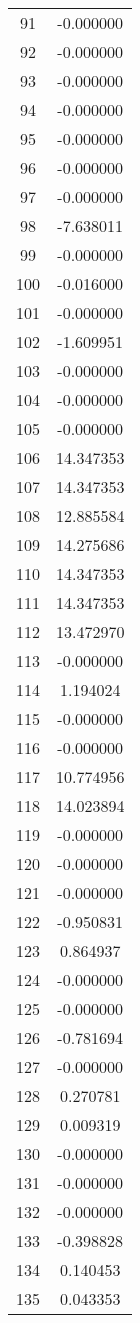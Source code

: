 \documentclass[12pt]{article}
\begin{document}
\begin{longtable}{@{}cc@{}}
91 & -0.000000 \\
92 & -0.000000 \\
93 & -0.000000 \\
94 & -0.000000 \\
95 & -0.000000 \\
96 & -0.000000 \\
97 & -0.000000 \\
98 & -7.638011 \\
99 & -0.000000 \\
100 & -0.016000 \\
101 & -0.000000 \\
102 & -1.609951 \\
103 & -0.000000 \\
104 & -0.000000 \\
105 & -0.000000 \\
106 & 14.347353 \\
107 & 14.347353 \\
108 & 12.885584 \\
109 & 14.275686 \\
110 & 14.347353 \\
111 & 14.347353 \\
112 & 13.472970 \\
113 & -0.000000 \\
114 & 1.194024 \\
115 & -0.000000 \\
116 & -0.000000 \\
117 & 10.774956 \\
118 & 14.023894 \\
119 & -0.000000 \\
120 & -0.000000 \\
121 & -0.000000 \\
122 & -0.950831 \\
123 & 0.864937 \\
124 & -0.000000 \\
125 & -0.000000 \\
126 & -0.781694 \\
127 & -0.000000 \\
128 & 0.270781 \\
129 & 0.009319 \\
130 & -0.000000 \\
131 & -0.000000 \\
132 & -0.000000 \\
133 & -0.398828 \\
134 & 0.140453 \\
135 & 0.043353 \\

\end{longtable}
\end{document}
